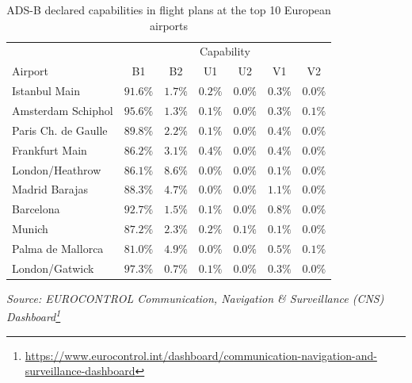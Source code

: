 \documentclass[
  11pt,
  a4paper,
]{book}
\DeclareRobustCommand{\href}[2]{#2\footnote{\url{#1}}}
\begin{document}
\hypertarget{tbl-adsb-top10}{}
\setlength{\LTpost}{0mm}
\begin{longtable}{lcccccc}
\caption{\label{tbl-adsb-top10}ADS-B declared capabilities in flight plans at the top 10 European
airports }\tabularnewline

\toprule
 & \multicolumn{6}{c}{Capability} \\ 
\cmidrule(lr){2-7}
Airport & B1 & B2 & U1 & U2 & V1 & V2 \\ 
\midrule
Istanbul Main & $91.6\%$ & $1.7\%$ & $0.2\%$ & $0.0\%$ & $0.3\%$ & $0.0\%$ \\ 
Amsterdam Schiphol & $95.6\%$ & $1.3\%$ & $0.1\%$ & $0.0\%$ & $0.3\%$ & $0.1\%$ \\ 
Paris Ch. de Gaulle & $89.8\%$ & $2.2\%$ & $0.1\%$ & $0.0\%$ & $0.4\%$ & $0.0\%$ \\ 
Frankfurt Main & $86.2\%$ & $3.1\%$ & $0.4\%$ & $0.0\%$ & $0.4\%$ & $0.0\%$ \\ 
London/Heathrow & $86.1\%$ & $8.6\%$ & $0.0\%$ & $0.0\%$ & $0.1\%$ & $0.0\%$ \\ 
Madrid Barajas & $88.3\%$ & $4.7\%$ & $0.0\%$ & $0.0\%$ & $1.1\%$ & $0.0\%$ \\ 
Barcelona & $92.7\%$ & $1.5\%$ & $0.1\%$ & $0.0\%$ & $0.8\%$ & $0.0\%$ \\ 
Munich & $87.2\%$ & $2.3\%$ & $0.2\%$ & $0.1\%$ & $0.1\%$ & $0.0\%$ \\ 
Palma de Mallorca & $81.0\%$ & $4.9\%$ & $0.0\%$ & $0.0\%$ & $0.5\%$ & $0.1\%$ \\ 
London/Gatwick & $97.3\%$ & $0.7\%$ & $0.1\%$ & $0.0\%$ & $0.3\%$ & $0.0\%$ \\ 
\bottomrule
\end{longtable}
\begin{minipage}{\linewidth}
\emph{Source: \href{https://www.eurocontrol.int/dashboard/communication-navigation-and-surveillance-dashboard}{EUROCONTROL Communication, Navigation \& Surveillance (CNS) Dashboard}}\\
\end{minipage}
\end{document}
